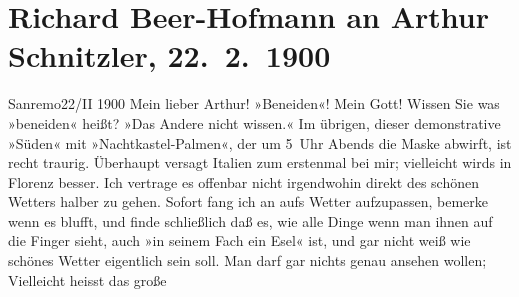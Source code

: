 

         
         \renewcommand{\erwaehntePersonen}{Personen: Christian Wilhelm Allers, Richard Beer-Hofmann, Paula Beer-Hofmann, Mirjam Beer-Hofmann, Georg Brandes, Berta Doepler, Georg Hirschfeld, Robert Hirschfeld, Hugo von Hofmannsthal, Oskar Mayer, Max Messer, Elly Petersen, Gustav Schwarzkopf}
         \renewcommand{\erwaehnteOrte}{Orte: Bad Ischl, Florenz, Italien, Sanremo, Wien}
         \renewcommand{\erwaehnteWerke}{Werke: Der Tod Georgs, Kabale und Liebe, Wiener Bummelgeschichten}
               \section[Richard Beer-Hofmann an Arthur Schnitzler, 22. 2. 1900]{ Richard Beer-Hofmann an Arthur Schnitzler, 22. 2. 1900}\nopagebreak{}\rehead{ }\begin{ledgroupsized}[t]{13cm}\normalsize\beginnumbering \toendnotes[C]{\smallbreak\pagebreak[2]} 
\toendnotes[C]{\smallbreak}\pstart
           \raggedleft{}{\pb}Sanremo22/II 1900\pend
           \pstart
           Mein lieber Arthur! »Beneiden«! Mein Gott! Wissen Sie was »beneiden«
               heißt? »Das Andere nicht wissen.« Im übrigen, dieser demonstrative »Süden« mit
               »Nachtkastel-Palmen«, der um 5 Uhr Abends die Maske abwirft, ist recht traurig.
               Überhaupt versagt Italien zum erstenmal bei
               mir; vielleicht wirds in Florenz besser. Ich
               vertrage es offenbar nicht irgendwohin direkt des schönen Wetters halber zu gehen.
               Sofort fang ich an aufs Wetter aufzupassen, bemerke wenn es blufft, und finde
               schließlich daß es, wie alle Dinge wenn man ihnen auf die Finger sieht, auch »in
               seinem Fach ein Esel« ist, und gar nicht weiß wie schönes Wetter eigentlich sein
               soll. Man darf gar nichts genau ansehen wollen; {\pb}Vielleicht heisst das große

\end{ledgroupsized}
